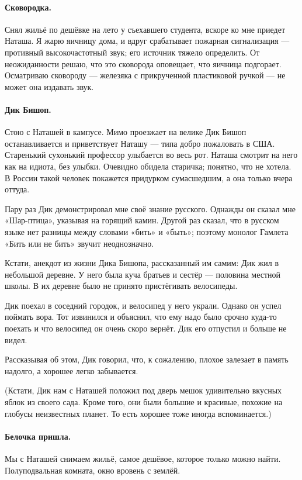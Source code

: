\documentclass{book}
\begin{document}
\paragraph{Сковородка.}
Снял жильё по дешёвке на лето у съехавшего студента, вскоре ко мне приедет Наташа.
Я жарю яичницу дома, и вдруг срабатывает пожарная сигнализация --- противный высокочастотный звук; его источник тяжело определить.
От неожиданности решаю, что это сковорода оповещает, что яичница подгорает.
Осматриваю сковороду --- железяка с прикрученной пластиковой ручкой --- не может она издавать звук.

\paragraph{Дик Бишоп.}
Стою с Наташей в кампусе.
Мимо проезжает на велике Дик Бишоп останавливается и приветствует Наташу --- типа добро пожаловать в США.
Старенький сухонький профессор улыбается во весь рот.
Наташа смотрит на него как на идиота, без улыбки.
Очевидно обидела старичка; понятно, что не хотела.
В России такой человек покажется придурком сумасшедшим, а она только вчера оттуда.

Пару раз Дик демонстрировал мне своё знание русского.
Однажды он сказал мне «Шар-птица», указывая на горящий камин.
Другой раз сказал, что в русском языке нет разницы между словами «бить» и «быть»;
поэтому монолог Гамлета «Бить или не бить» звучит неоднозначно.

Кстати, анекдот из жизни Дика Бишопа, рассказанный им самим:
Дик жил в небольшой деревне.
У него была куча братьев и сестёр --- половина местной школы.
В их деревне было не принято пристёгивать велосипеды.

Дик поехал в соседний городок, и велосипед у него украли.
Однако он успел поймать вора.
Тот извинился и объяснил, что ему надо было срочно куда-то поехать и что велосипед он очень скоро вернёт.
Дик его отпустил и больше не видел.

Рассказывая об этом, Дик говорил, что, к сожалению, плохое залезает в память надолго, а хорошее легко забывается.

(Кстати, Дик нам с Наташей положил под дверь мешок удивительно вкусных яблок из своего сада.
Кроме того, они были большие и красивые, похожие на глобусы неизвестных планет.
То есть хорошее тоже иногда вспоминается.)

\paragraph{Белочка пришла.}
Мы с Наташей снимаем жильё, самое дешёвое, которое только можно найти.
Полуподвальная комната, окно вровень с землёй.
\end{document}
